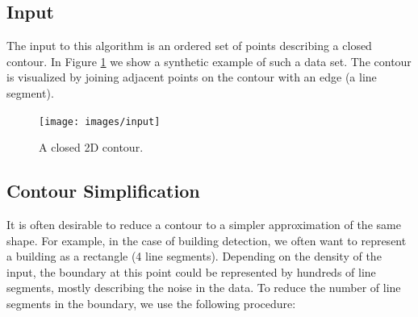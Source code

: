 \documentclass{InsightArticle}
\begin{document}
\subsection{Input}
\label{sec:Algorithm:Input}
The input to this algorithm is an ordered set of points describing a closed contour. In Figure \ref{fig:Input} we show a synthetic example of such a data set. The contour is visualized by joining adjacent points on the contour with an edge (a line segment).

\begin{figure}[H]
  \centering
  \texttt{[image: images/input]}
  \caption{A closed 2D contour.}
  \label{fig:Input}
\end{figure}

\subsection{Contour Simplification}
\label{sec:Algorithm:ContourSimplification}
It is often desirable to reduce a contour to a simpler approximation of the same shape. For example, in the case of building detection, we often want to represent a building as a rectangle (4 line segments). Depending on the density of the input, the boundary at this point could be represented by hundreds of line segments, mostly describing the noise in the data. To reduce the number of line segments in the boundary, we use the following procedure:
\end{document}
